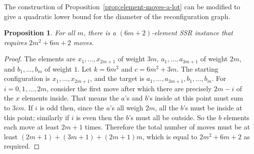\documentclass{robinminion}
\newtheorem{prop}{Proposition}
\begin{document}
\noindent The construction of Proposition~\ref{prop:element-moves-a-lot} can be modified to give a quadratic lower bound for the diameter of the reconfiguration graph.
\begin{prop}\label{prop:quadratic-bound}
    For all $m$, there is a $(6m+2)$-element SSR instance that requires $2m^2+6m+2$ moves.
\end{prop}
\begin{proof}
    The elements are
    $x_1, \dots, x_{2m+1}$ of weight $3m$,
    $a_1, \dots, a_{3m+1}$ of weight $2m$,
    and $b_1, \dots, b_m$ of weight $1$.
    Let $k=6m^2$ and $c=6m^2+3m$.
    The starting configuration is $x_1, \dots, x_{2m+1}$,
    and the target is $a_1, \dots, a_{3m+1}, b_1, \dots, b_m$.
    For $i=0, 1, \dots, 2m$, consider the first move after which there are precisely $2m-i$ of the $x$ elements inside. That means the $a$'s and $b$'s inside at this point must sum to $3im$. If $i$ is odd then, since the $a$'s all weigh $2m$, all the $b$'s must be inside at this point; similarly if $i$ is even then the $b$'s must all be outside. So the $b$ elements each move at least $2m+1$ times.
    Therefore the total number of moves must be at least $(2m+1) + (3m+1) + (2m+1)m$, which is equal to $2m^2+6m+2$ as required.
\end{proof}
\end{document}
